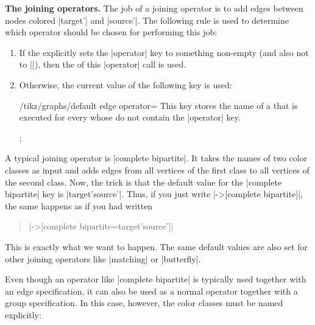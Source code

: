 \medskip
\textbf{The joining operators.} The job of a joining operator is
to add edges between nodes colored |target'| and |source'|. The
following rule is used to determine which operator should be chosen
for performing this job:
\begin{enumerate}
\item If the  explicitly sets the |operator|
  key to something non-empty (and also not to |\relax|), then the
   of this |operator| call is used.
\item Otherwise, the current value of the following key is used: 
  \begin{key}{/tikz/graphs/default edge operator=}
    This key stores the name of a  that is executed for every
     whose  do not contain the
    |operator| key.
\begin{codeexample}[]
\tikz {};    
\end{codeexample}
  \end{key}
\end{enumerate}

A typical joining operator is |complete bipartite|. It takes the names of two
color classes as input and adds edges from all vertices of the first
class to all vertices of the second class. Now, the trick is that the
default value for the |complete bipartite| key is |{target'}{source'}|. Thus,
if you just write |->[complete bipartite]|, the same happens as if you had
written
\begin{quote}
|->[complete bipartite={target'}{source'}]|    
\end{quote}
This is exactly what we want to happen. The same default values are
also set for other joining operators like |matching| or |butterfly|.

Even though an operator like |complete bipartite| is typically used
together with an edge specification, it can also be used as a normal
operator together with a group specification. In this case, however,
the color classes must be named explicitly:

\begin{codeexample}[]
\end{codeexample}


